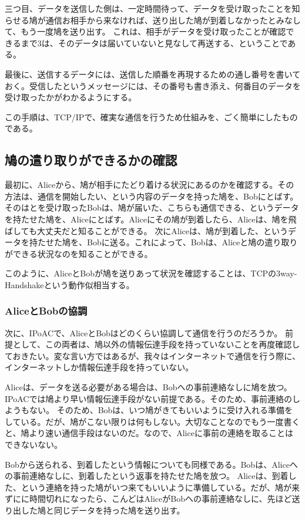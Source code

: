 三つ目、データを送信した側は、一定時間待って、データを受け取ったことを知らせる鳩が通信お相手から来なければ、送り出した鳩が到着しなかったとみなして、もう一度鳩を送り出す。
これは、相手がデータを受け取ったことが確認できるまで3は、そのデータは届いていないと見なして再送する、ということである。

最後に、送信するデータには、送信した順番を再現するための通し番号を書いておく。受信したというメッセージには、その番号も書き添え、何番目のデータを受け取ったかがわかるようにする。

この手順は、TCP/IPで、確実な通信を行うため仕組みを、ごく簡単にしたものである。


\subsection{鳩の遣り取りができるかの確認}

最初に、Aliceから、鳩が相手にたどり着ける状況にあるのかを確認する。その方法は、通信を開始したい、という内容のデータを持った鳩を、Bobにとばす。
そのはとを受け取ったBobは、鳩が届いた、こちらも通信できる、というデータを持たせた鳩を、Aliceにとばす。Aliceにその鳩が到着したら、Aliceは、鳩を飛ばしても大丈夫だと知ることができる。
次にAliceは、鳩が到着した、というデータを持たせた鳩を、Bobに送る。これによって、Bobは、Aliceと鳩の遣り取りができる状況なのを知ることができる。

このように、AliceとBobが鳩を送りあって状況を確認することは、TCPの3way-Handshakeという動作似相当する。


\subsubsection{AliceとBobの協調}
次に、IPoACで、AliceとBobはどのくらい協調して通信を行うのだろうか。
前提として、この両者は、鳩以外の情報伝達手段を持っていないことを再度確認しておきたい。変な言い方ではあるが、我々はインターネットで通信を行う際に、インターネットしか情報伝達手段を持っていない。

Aliceは、データを送る必要がある場合は、Bobへの事前連絡なしに鳩を放つ。
IPoACでは鳩より早い情報伝達手段がない前提である。そのため、事前連絡のしようもない。
そのため、Bobは、いつ鳩がきてもいいように受け入れる準備をしている。だが、鳩がこない限りは何もしない。大切なことなのでもう一度書くと、鳩より速い通信手段はないのだ。なので、Aliceに事前の連絡を取ることはできないない。

Bobから送られる、到着したという情報についても同様である。Bobは、Aliceへの事前連絡なしに、到着したという返事を持たせた鳩を放つ。
Aliceは、到着した、という連絡を持った鳩がいつ来てもいいように準備している。だが、鳩が来ずにに時間切れになったら、こんどはAliceがBobへの事前連絡なしに、先ほど送り出した鳩と同じデータを持った鳩を送り出す。


